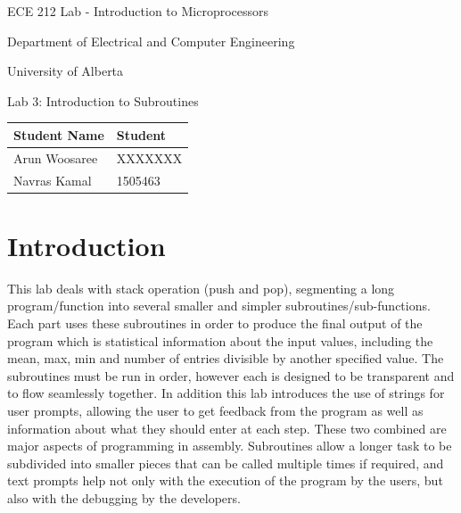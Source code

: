 \documentclass[letterpaper]{article}
\begin{document}
  \begin{titlepage}
    \begin{center}

      \LARGE
      ECE 212 Lab - Introduction to Microprocessors

      Department of Electrical and Computer Engineering

      University of Alberta

      \vspace{2cm}

      Lab 3: Introduction to Subroutines

      \vspace{5cm}
      \Large

      \begin{tabular}{ | m{5cm} | m{5cm} | }
        \hline
        Student Name & Student \\
        \hline
        Arun Woosaree & XXXXXXX \\
        \hline
        Navras Kamal & 1505463 \\
        \hline
      \end{tabular}




    \end{center}
\end{titlepage}


\tableofcontents

\newpage

\section{Introduction}
This lab deals with stack operation (push and pop), segmenting a long program/function into several smaller and simpler subroutines/sub-functions. Each part uses these subroutines in order to produce the final output of the program which is statistical information about the input values, including the mean, max, min and number of entries divisible by another specified value.  The subroutines must be run in order, however each is designed to be transparent and to flow seamlessly together.  In addition this lab introduces the use of strings for user prompts, allowing the user to get feedback from the program as well as information about what they should enter at each step.  These two combined are major aspects of programming in assembly.  Subroutines allow a longer task to be subdivided into smaller pieces that can be called multiple times if required, and text prompts help not only with the execution of the program by the users, but also with the debugging by the developers.
\end{document}
